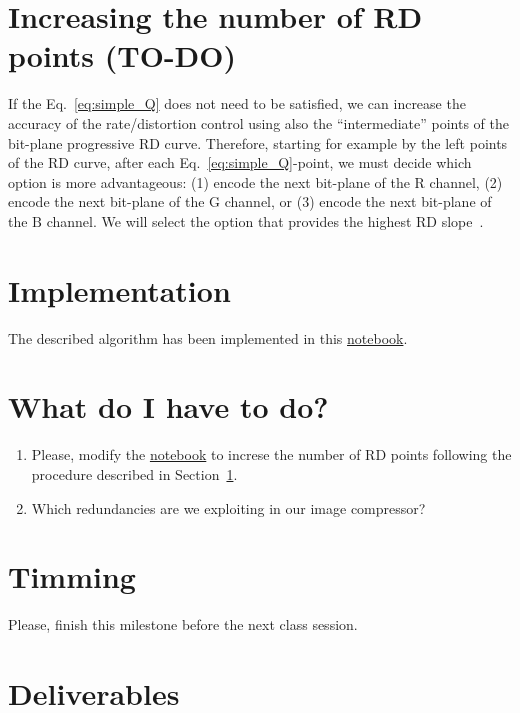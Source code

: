 \section{Increasing the number of RD points (TO-DO)}
\label{sec:increasing}
If the Eq.~\eqref{eq:simple_Q} does not need to be satisfied, we can
increase the accuracy of the rate/distortion control using also the
``intermediate'' points of the bit-plane progressive RD
curve. Therefore, starting for example by the left points of the RD
curve, after each Eq.~\eqref{eq:simple_Q}-point, we must decide which
option is more advantageous: (1) encode the next bit-plane of the
$\text{R}$ channel, (2) encode the next bit-plane of the $\text{G}$
channel, or (3) encode the next bit-plane of the $\text{B}$
channel. We will select the option that provides the highest RD
slope~\cite{vruiz__information_theory}.

\section{Implementation}
The described algorithm has been implemented in this
\href{https://github.com/Sistemas-Multimedia/Sistemas-Multimedia.github.io/blob/master/contents/RGB_SQ/RGB_SQ.ipynb}{notebook}.

\section{What do I have to do?}

\begin{enumerate}
\item Please, modify the
  \href{https://github.com/Sistemas-Multimedia/Sistemas-Multimedia.github.io/blob/master/contents/RGB_SQ/RGB_SQ.ipynb}{notebook}
  to increse the number of RD points following the procedure described
  in Section~\ref{sec:increasing}.
\item Which redundancies are we exploiting in our image compressor?
\end{enumerate}

\section{Timming}

Please, finish this milestone before the next class session.

\section{Deliverables}

